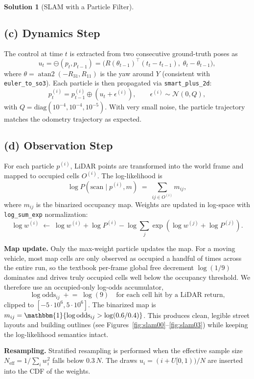 \documentclass[11pt, reqno, letterpaper, twoside]{amsart}
\theoremstyle{plain}
\theoremstyle{definition}
\newtheorem{solution}[theorem]{Solution}
\begin{document}
\begin{solution}[SLAM with a Particle Filter]
\subsection*{(c) Dynamics Step}

The control at time $t$ is extracted from two consecutive ground-truth poses as
\[
  u_t = \ominus (p_t, p_{t-1}) = \bigl(R(\theta_{t-1})^{\!\top}(t_t - t_{t-1}),\; \theta_t - \theta_{t-1}\bigr),
\]
where $\theta = \operatorname{atan2}(-R_{31}, R_{11})$ is the yaw around $Y$ (consistent with \texttt{euler\_to\_so3}). Each particle is then propagated via \texttt{smart\_plus\_2d}:
\[
  p^{(i)}_t = p^{(i)}_{t-1} \oplus (u_t + \epsilon^{(i)}),\qquad \epsilon^{(i)} \sim \mathcal{N}(0, Q),
\]
with $Q = \mathrm{diag}(10^{-4}, 10^{-4}, 10^{-5})$.  With very small noise, the particle trajectory matches the odometry trajectory as expected.

\subsection*{(d) Observation Step}

For each particle $p^{(i)}$, LiDAR points are transformed into the world frame and mapped to occupied cells $O^{(i)}$.  The log-likelihood is
\[
  \log P(\text{scan} \mid p^{(i)}, m) \;=\; \sum_{ij \in O^{(i)}} m_{ij},
\]
where $m_{ij}$ is the binarized occupancy map.  Weights are updated in log-space with \texttt{log\_sum\_exp} normalization:
\[
  \log w^{(i)} \;\leftarrow\; \log w^{(i)} + \log P^{(i)} - \log\!\sum_j \exp(\log w^{(j)} + \log P^{(j)}).
\]

\medskip
\noindent\textbf{Map update.}
Only the max-weight particle updates the map.  For a moving vehicle, most map cells are only observed as occupied a handful of times across the entire run, so the textbook per-frame global free decrement $\log(1/9)$ dominates and drives truly occupied cells well below the occupancy threshold.  We therefore use an occupied-only log-odds accumulator,
\[
  \log\mathrm{odds}_{ij} \;\mathrel{+}{=}\; \log(9) \quad \text{for each cell hit by a LiDAR return,}
\]
clipped to $[-5\!\cdot\!10^6, 5\!\cdot\!10^6]$.  The binarized map is $m_{ij} = \mathbbm{1}\{\log\mathrm{odds}_{ij} > \log(0.6/0.4)\}$.  This produces clean, legible street layouts and building outlines (see Figures~\ref{fig:slam00}--\ref{fig:slam03}) while keeping the log-likelihood semantics intact.

\medskip
\noindent\textbf{Resampling.}
Stratified resampling is performed when the effective sample size $N_{\text{eff}} = 1/\sum_i w_i^2$ falls below $0.3\,N$.  The draws $u_i = (i + U[0,1))/N$ are inserted into the CDF of the weights.


\end{solution}
\end{document}

